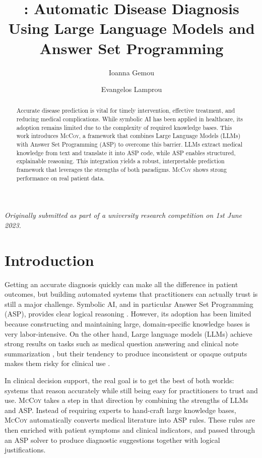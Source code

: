 \documentclass[11pt,leqno]{amsart}
\title[\sys: Automatic Disease Diagnosis Using LLMs \& ASP]{\sys: Automatic Disease Diagnosis Using Large Language Models and Answer Set Programming}
\author[Ioanna Gemou]{Ioanna Gemou}
\author[Evangelos Lamprou]{Evangelos Lamprou}
\newcommand{\sys}{\textsc{McCoy}\xspace}
\begin{document}
\maketitle
\vspace{-1.5em} %
{\small\itshape \centering Originally submitted as part of a university research competition on 1st June 2023.\par}
\vspace{0.5em} %

\begin{abstract}
Accurate disease prediction is vital for timely intervention, 
effective treatment, and reducing medical complications. 
While symbolic AI has been applied in healthcare, 
its adoption remains limited due to the complexity 
of required knowledge bases.
This work introduces \sys, a framework that combines Large Language Models (LLMs) 
with Answer Set Programming (ASP) to overcome this barrier. 
LLMs extract medical knowledge from text and translate it into ASP code, 
while ASP enables structured, explainable reasoning. 
This integration yields a robust, interpretable prediction framework 
that leverages the strengths of both paradigms. 
\sys shows strong performance on real patient data.
\end{abstract}

\section{Introduction}
Getting an accurate diagnosis quickly can make all the difference in patient outcomes, 
but building automated systems that practitioners can actually trust is still a major challenge. 
Symbolic AI, and in particular Answer Set Programming (ASP), provides clear logical reasoning \cite{Brewka2011,Gelfond_Kahl_2014}. 
However, its adoption has been limited because constructing and maintaining large, 
domain-specific knowledge bases is very labor-intensive.
On the other hand, Large language models (LLMs) achieve strong results on tasks
such as medical question answering and clinical note summarization \cite{Singhal2022LargeLM,Singhal2023,Zheng2024LLMmed}, 
but their tendency to produce inconsistent or opaque outputs makes them risky for clinical use \cite{aljohani2025comprehensivesurveytrustworthinesslarge, rudin2019stopexplainingblackbox}.

In clinical decision support, the real goal is to get the best of both worlds: 
systems that reason accurately while still being easy for practitioners to trust and use. 
\sys takes a step in that direction by combining the strengths of LLMs and ASP. 
Instead of requiring experts to hand-craft large knowledge bases, 
\sys automatically converts medical literature into ASP rules. 
These rules are then enriched with patient symptoms and clinical indicators, 
and passed through an ASP solver to produce diagnostic suggestions together with logical justifications.
\end{document}
